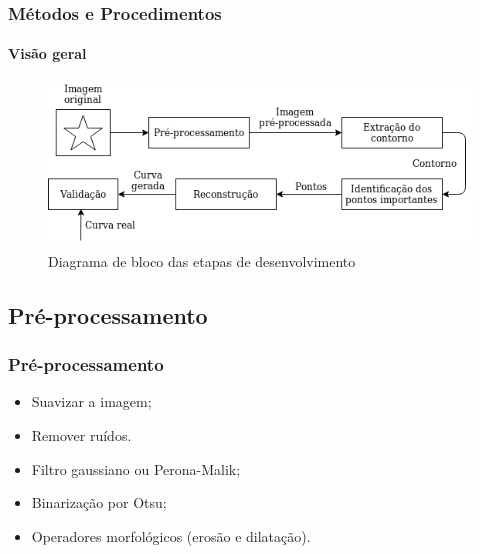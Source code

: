 \begin{frame}
\frametitle{Métodos e Procedimentos}
\framesubtitle{Visão geral}

\begin{figure}[hbt]
	\begin{center}
		\caption{Diagrama de bloco das etapas de desenvolvimento}
		\includegraphics[width=1\textwidth]{img/diagrama.png}
	\end{center}
\end{figure}

\end{frame}

\subsection{Pré-processamento}

\begin{frame}
\frametitle{Pré-processamento}

\begin{itemize}
\item Suavizar a imagem;
\item Remover ruídos.
\end{itemize}

\bigskip
{}
\begin{itemize}
	\item Filtro gaussiano ou Perona-Malik;
	\item Binarização por Otsu;
	\item Operadores morfológicos (erosão e dilatação).
\end{itemize}
\end{frame}

